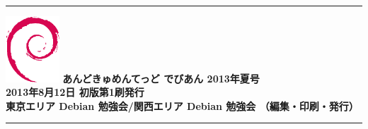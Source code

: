 \documentclass[mingoth,a4paper]{jsarticle}
\begin{document}
\vspace*{13cm}
{\color{dancerlightblue}\rule{\hsize}{1mm}}
\vspace{2mm}
\includegraphics[width=2cm]{image200502/openlogo-nd.eps}
\noindent \Large \bf あんどきゅめんてっど でびあん 2013年夏号\\
\noindent \normalfont 2013年8月12日 \hspace{5mm}  初版第1刷発行\\
\noindent \normalfont 東京エリア Debian 勉強会/関西エリア Debian 勉強会 （編集・印刷・発行）\\
{\color{dancerdarkblue}\rule{\hsize}{1mm}}
\end{document}
